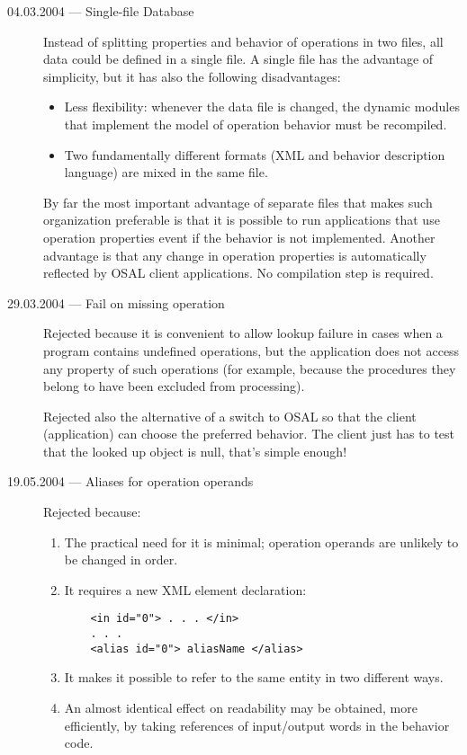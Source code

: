 \documentclass[twoside]{tce}
\begin{document}
\begin{description}
\item[04.03.2004 --- Single-file Database] %
  Instead of splitting properties and behavior of operations in two files,
  all data could be defined in a single file.  A single file has the
  advantage of simplicity, but it has also the following disadvantages:
  \begin{itemize}
  \item %
    Less flexibility: whenever the data file is changed, the dynamic modules
    that implement the model of operation behavior must be recompiled.
  \item%
    Two fundamentally different formats (XML and behavior description
    language) are mixed in the same file.
  \end{itemize}
  By far the most important advantage of separate files that makes such
  organization preferable is that it is possible to run applications that
  use operation properties event if the behavior is not implemented.
  Another advantage is that any change in operation properties is
  automatically reflected by OSAL client applications.  No compilation step
  is required.
\item[29.03.2004 --- Fail on missing operation] %
  Rejected because it is convenient to allow lookup failure in cases when a
  program contains undefined operations, but the application does not access
  any property of such operations (for example, because the procedures they
  belong to have been excluded from processing).

  Rejected also the alternative of a switch to OSAL so that the client
  (application) can choose the preferred behavior.  The client just has to
  test that the looked up object is null, that's simple enough!
\item[19.05.2004 --- Aliases for operation operands] %
  Rejected because:
  \begin{enumerate}
  \item %
    The practical need for it is minimal; operation operands are unlikely to
    be changed in order.
  \item %
    It requires a new XML element declaration:
\begin{verbatim}
    <in id="0"> . . . </in>
    . . .
    <alias id="0"> aliasName </alias>
\end{verbatim}
  \item %
    It makes it possible to refer to the same entity in two different ways.
  \item %
    An almost identical effect on readability may be obtained, more
    efficiently, by taking references of input/output words in the behavior
    code.
  \end{enumerate}
\end{description}
\end{document}
